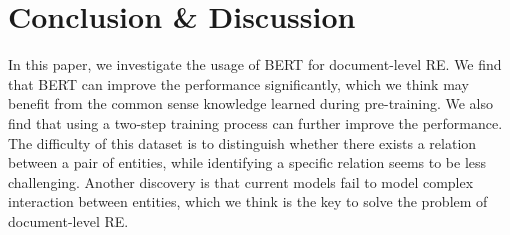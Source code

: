 \documentclass[11pt,a4paper]{article}
\begin{document}
\section{Conclusion \& Discussion}
In this paper, we investigate the usage of BERT for document-level RE. We find that BERT can improve the performance significantly, which we think may benefit from the common sense knowledge learned during pre-training. We also find that using a two-step training process can further improve the performance. The difficulty of this dataset is to distinguish whether there exists a relation between a pair of entities, while identifying a specific relation seems to be less challenging. Another discovery is that current models fail to model complex interaction between entities, which we think is the key to solve the problem of document-level RE.




\appendix
\end{document}
